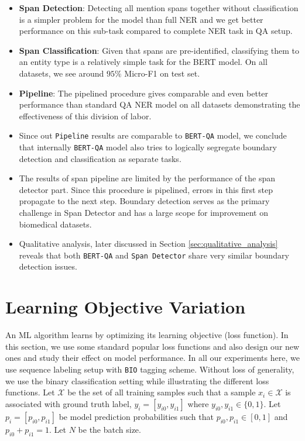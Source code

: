 \begin{itemize}
    \item \textbf{Span Detection}: Detecting all mention spans together without classification is a simpler problem for the model than full NER and we get better performance on this sub-task compared to complete NER task in QA setup.
    
    \item \textbf{Span Classification}: Given that spans are pre-identified, classifying them to an entity type is a relatively simple task for the BERT model. On all datasets, we see around $95\%$ Micro-F1 on test set.
    
    \item \textbf{Pipeline}: The pipelined procedure gives comparable and even better performance than standard QA NER model on all datasets demonstrating the effectiveness of this division of labor. 
    
    \item Since out \texttt{Pipeline} results are comparable to \texttt{BERT-QA} model, we conclude that internally \texttt{BERT-QA} model also tries to logically segregate boundary detection and classification as separate tasks.
    
    \item The results of span pipeline are limited by the performance of the span detector part. Since this procedure is pipelined, errors in this first step propagate to the next step. Boundary detection serves as the primary challenge in Span Detector and has a large scope for improvement on biomedical datasets.
    
    \item Qualitative analysis, later discussed in Section \ref{sec:qualitative_analysis} reveals that both \texttt{BERT-QA} and \texttt{Span Detector} share very similar boundary detection issues.
\end{itemize}

\section{Learning Objective Variation}
An ML algorithm learns by optimizing its learning objective (loss function). In this section, we use some standard popular loss functions and also design our new ones and study their effect on model performance. In all our experiments here, we use sequence labeling setup with \texttt{BIO} tagging scheme. Without loss of generality, we use the binary classification setting while illustrating the different loss functions. Let $\mathcal{X}$ be the set of all training samples such that a sample $x_i \in \mathcal{X}$ is associated with ground truth label, $y_i = [y_{i0}, y_{i1}]$ where $y_{i0}, y_{i1} \in \{0, 1\}$. Let $p_i = [p_{i0}, p_{i1}]$ be model prediction probabilities such that $p_{i0}, p_{i1} \in [0, 1]$ and $p_{i0} + p_{i1} = 1$. Let $N$ be the batch size.

